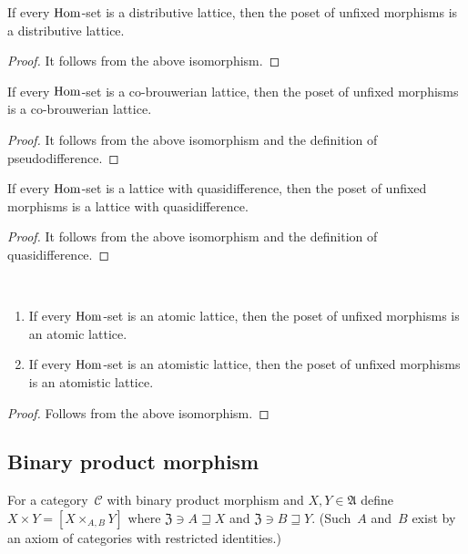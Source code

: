 \begin{prop}
If every $\operatorname{Hom}$-set is a distributive lattice, then
the poset of unfixed morphisms is a distributive lattice.
\end{prop}

\begin{proof}
It follows from the above isomorphism.
\end{proof}

\begin{prop}
If every $\operatorname{Hom}$-set is a co-brouwerian lattice, then
the poset of unfixed morphisms is a co-brouwerian lattice.
\end{prop}

\begin{proof}
It follows from the above isomorphism and the definition
of pseudodifference.
\end{proof}

\begin{prop}
If every $\operatorname{Hom}$-set is a lattice with quasidifference, then
the poset of unfixed morphisms is a lattice with
quasidifference.
\end{prop}

\begin{proof}
It follows from the above isomorphism and the definition
of quasidifference.
\end{proof}

\begin{prop}
~
\begin{enumerate}
\item If every $\operatorname{Hom}$-set is an atomic lattice, then
the poset of unfixed morphisms is an atomic lattice.
\item If every $\operatorname{Hom}$-set is an atomistic lattice, then
the poset of unfixed morphisms is an atomistic lattice.
\end{enumerate}
\end{prop}

\begin{proof}
Follows from the above isomorphism.
\end{proof}

\subsection{Binary product morphism}

\begin{defn}
For a category~$\mathcal{C}$ with binary product morphism
and $X,Y\in\mathfrak{A}$ define
$X\times Y=[X\times_{A,B}Y]$ where
$\mathfrak{Z}\ni A\sqsupseteq X$ and
$\mathfrak{Z}\ni B\sqsupseteq Y$.
(Such~$A$ and~$B$ exist by an axiom of categories with
restricted identities.)
\end{defn}

